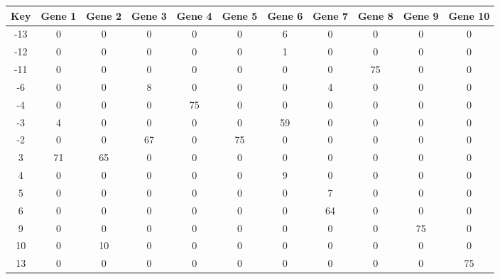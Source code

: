 \begin{tabular}{|c|c|c|c|c|c|c|c|c|c|c|}
\hline
Key & Gene 1 & Gene 2 & Gene 3 & Gene 4 & Gene 5 & Gene 6 & Gene 7 & Gene 8 & Gene 9 & Gene 10 \\
\hline
-13 & 0 & 0 & 0 & 0 & 0 & 6 & 0 & 0 & 0 & 0 \\
-12 & 0 & 0 & 0 & 0 & 0 & 1 & 0 & 0 & 0 & 0 \\
-11 & 0 & 0 & 0 & 0 & 0 & 0 & 0 & 75 & 0 & 0 \\
-6 & 0 & 0 & 8 & 0 & 0 & 0 & 4 & 0 & 0 & 0 \\
-4 & 0 & 0 & 0 & 75 & 0 & 0 & 0 & 0 & 0 & 0 \\
-3 & 4 & 0 & 0 & 0 & 0 & 59 & 0 & 0 & 0 & 0 \\
-2 & 0 & 0 & 67 & 0 & 75 & 0 & 0 & 0 & 0 & 0 \\
3 & 71 & 65 & 0 & 0 & 0 & 0 & 0 & 0 & 0 & 0 \\
4 & 0 & 0 & 0 & 0 & 0 & 9 & 0 & 0 & 0 & 0 \\
5 & 0 & 0 & 0 & 0 & 0 & 0 & 7 & 0 & 0 & 0 \\
6 & 0 & 0 & 0 & 0 & 0 & 0 & 64 & 0 & 0 & 0 \\
9 & 0 & 0 & 0 & 0 & 0 & 0 & 0 & 0 & 75 & 0 \\
10 & 0 & 10 & 0 & 0 & 0 & 0 & 0 & 0 & 0 & 0 \\
13 & 0 & 0 & 0 & 0 & 0 & 0 & 0 & 0 & 0 & 75 \\
\hline
\end{tabular}